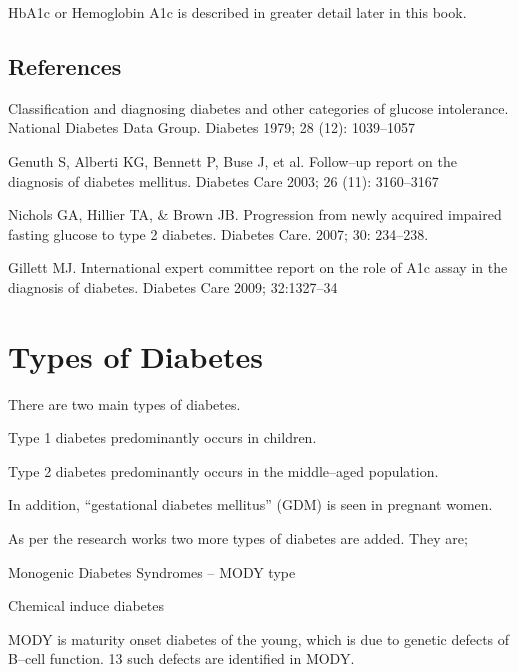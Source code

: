 HbA1c or Hemoglobin A1c is described in greater detail later in this book.

\section*{References}

\begin{thebibliography}{99}
 Classification and diagnosing diabetes and other categories of glucose intolerance. National Diabetes Data Group. Diabetes 1979; 28 (12): 1039–1057

  Genuth S, Alberti KG, Bennett P, Buse J, et al. Follow–up report on the diagnosis of diabetes mellitus. Diabetes Care 2003; 26 (11): 3160–3167

  Nichols GA, Hillier TA, \& Brown JB. Progression from newly acquired impaired fasting glucose to type 2 diabetes. Diabetes Care. 2007; 30: 234–238.

  Gillett MJ. International expert committee report on the role of A1c assay in the diagnosis of diabetes. Diabetes Care 2009; 32:1327–34

 \end{thebibliography}


\chapter{Types of Diabetes}

There are two main types of diabetes.

Type 1 diabetes predominantly occurs in children.

Type 2 diabetes predominantly occurs in the middle–aged population.

In addition, “gestational diabetes mellitus” (GDM) is seen in pregnant women.

As per the research works two more types of diabetes are added. They are;

\item Monogenic Diabetes Syndromes – MODY type

 \item Chemical induce diabetes

MODY is maturity onset diabetes of the young, which is due to genetic defects of B–cell function. 13 such defects are identified in MODY.

